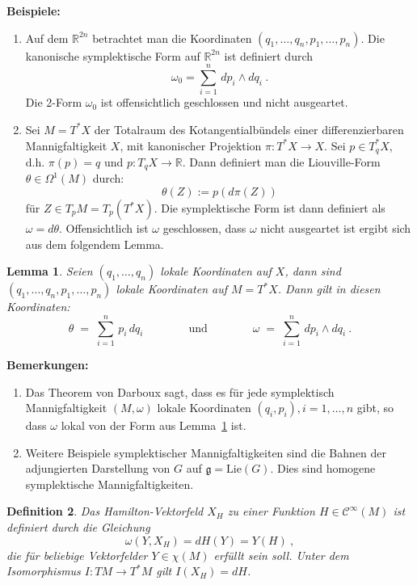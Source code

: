\documentclass[12pt,a4paper]{article}
\def\R{\mathbb{R}}
\def\Lie{\mathrm{Lie}}
\def\g{\mathfrak{g}}
\newtheorem{Lemma}{Lemma}[section]
\newtheorem{Definition}[Lemma]{Definition}
\begin{document}
\bigskip

{\bf Beispiele:}
\begin{enumerate}
\item
Auf dem $\R^{2n}$ betrachtet man die Koordinaten $(q_1, \ldots, q_n, p_1, \ldots, p_n)$. Die kanonische
symplektische Form auf $\R^{2n}$ ist definiert durch
$$
\omega_0 = \sum^n_{i=1}\, dp_i \wedge dq_i \ .
$$
Die 2-Form $\omega_0$ ist offensichtlich geschlossen und nicht ausgeartet.
\item
Sei $M = T^*X$ der Totalraum des Kotangentialb\"undels einer differenzierbaren Mannigfaltigkeit $X$,
mit kanonischer Projektion $\pi : T^*X \rightarrow X$. Sei $p \in T^*_qX  $, d.h. $\pi(p) = q$ und $
p:T_qX\rightarrow \R$. Dann definiert man die Liouville-Form $\theta \in \Omega^1(M)$ durch:
$$
\theta (Z) := p(d\pi (Z))
$$
f\"ur $Z\in T_p M = T_p(T^*X)$. Die symplektische Form ist dann definiert als $\omega = d\theta$.
Offensichtlich ist $\omega$ geschlossen, dass $\omega$ nicht ausgeartet ist ergibt sich aus dem
folgendem Lemma.
\end{enumerate}

\bigskip

\begin{Lemma}\label{darboux}
Seien $(q_1, \ldots, q_n)$ lokale Koordinaten auf $X$, dann sind $(q_1, \ldots, q_n, p_1,\ldots, p_n)$
lokale Koordinaten auf $M= T^*X$. Dann gilt in diesen Koordinaten:
\begin{equation*}
\theta \;=\; \sum_{i=1}^n\, p_i \, dq_i
\qquad \qquad \mbox{und}\qquad \qquad
\omega \;=\; \sum_{i=1}^n\, dp_i \wedge dq_i \ .
\end{equation*}
\end{Lemma}

\bigskip

{\bf Bemerkungen:}
\begin{enumerate}
\item
Das Theorem von Darboux sagt, dass es f\"ur jede symplektisch Mannigfaltigkeit $(M, \omega)$
lokale Koordinaten $(q_i, p_i), i=1, \ldots, n$ gibt, so dass $\omega$ lokal von der Form aus Lemma~\ref{darboux}
ist.
\item
Weitere Beispiele symplektischer Mannigfaltigkeiten sind die Bahnen der adjungierten Darstellung von $G$ auf
$\g = \Lie(G)$. Dies sind homogene symplektische Mannigfaltigkeiten.
\end{enumerate}

\bigskip

\begin{Definition}
Das {\em Hamilton-Vektorfeld} $X_H$ zu einer Funktion $H \in \mathcal C^\infty(M)$
ist definiert durch die Gleichung
$$
\omega(Y, X_H) = dH(Y) = Y(H) \ ,
$$
die f\"ur beliebige Vektorfelder $Y \in \chi(M)$ erf\"ullt sein soll. Unter dem Isomorphismus
$I:TM\rightarrow T^*M$ gilt $I(X_H) = dH$.
\end{Definition}
\end{document}
